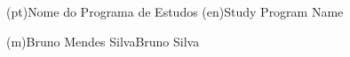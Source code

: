 \ntdegreename*(pt){Nome do Programa de Estudos}
\ntdegreename*(en){Study Program Name}




\ntauthorname(m){Bruno Mendes Silva}{Bruno Silva}

